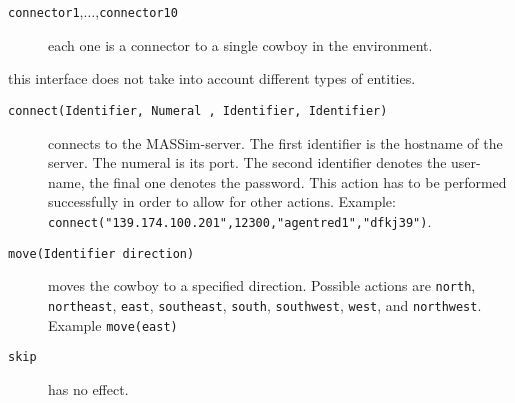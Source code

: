 \documentclass[a4]{article}
\begin{document}
\medskip{}
\begin{description}
\item[\texttt{connector1},$\ldots$,\texttt{connector10}] each one is a connector to a single cowboy in the environment.
\end{description}

 this interface does not take into account different types of entities.

\medskip{}
\begin{description}
\item[\texttt{connect(Identifier, Numeral , Identifier, Identifier)}] connects to the MASSim-server.
The first identifier is the hostname of the server. The numeral is its port. The second identifier denotes the user-name,
the final one denotes the password. This action has to be performed successfully in order to allow for other actions.
Example: \texttt{connect("139.174.100.201",12300,"agentred1","dfkj39")}.
\item[\texttt{move(Identifier direction)}] moves the cowboy to a specified direction. 
Possible actions are \texttt{north}, \texttt{northeast}, \texttt{east}, \texttt{southeast}, \texttt{south}, \texttt{southwest},
\texttt{west}, and \texttt{northwest}. Example \texttt{move(east)}
\item[\texttt{skip}] has no effect.
\end{description}
\end{document}
